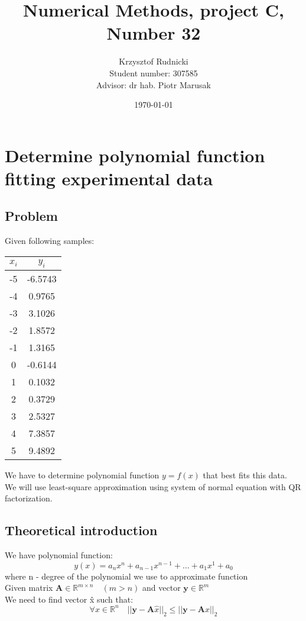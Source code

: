 \documentclass[12pt]{report}
\title{Numerical Methods, project C, Number 32}
\author{Krzysztof Rudnicki\\ Student number: 307585 \\ Advisor: dr hab. Piotr Marusak}
\date{\today}
\begin{document}
\maketitle
\tableofcontents

\chapter{Determine polynomial function fitting experimental data}
\section{Problem}
Given following samples:
\begin{center}
  \begin{tabular}{| c | c |}
\hline
$x_i$ & $y_i$ \\
\hline
-5 & -6.5743\\
\hline
-4 & 0.9765\\
\hline
-3 & 3.1026\\
\hline
-2 & 1.8572 \\
\hline
-1 & 1.3165 \\
\hline
0 & -0.6144 \\
\hline
1 & 0.1032 \\
\hline
2 & 0.3729 \\
\hline
3 & 2.5327 \\
\hline
4 & 7.3857 \\
\hline
5 & 9.4892 \\
\hline

\end{tabular}
\end{center}

We have to determine polynomial function $ y  = f(x) $ that best fits this data. \\
We will use least-square approximation using system of normal equation with QR factorization.

\section{Theoretical introduction}
We have polynomial function:
\[ y(x) = a_nx^n + a_{n-1}x^{n-1} + \dots + a_1x^1 + a_0 \]
where n - degree of the polynomial we use to approximate function \\
Given matrix $\mathbf{A} \in \mathbb{R}^{m \times n} \quad (m > n)$ and vector $\mathbf{y} \in \mathbb{R}^m$ \\
We need to find vector \^{x} such that:
\[ 	\forall x \in \mathbb{R}^n \quad|| \mathbf{y} - \mathbf{A} \hat{x} ||_2 \leq || \mathbf{y} - \mathbf{A}x ||_2  \]
\end{document}
